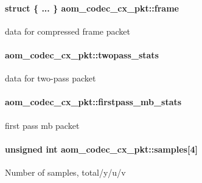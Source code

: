 \paragraph[{\texorpdfstring{frame}{frame}}]{\setlength{\rightskip}{0pt plus 5cm}struct \{ ... \}   aom\+\_\+codec\+\_\+cx\+\_\+pkt\+::frame}\hypertarget{structaom__codec__cx__pkt_a4180a6ae59b0d295bc915d4689df4cb0}{}\label{structaom__codec__cx__pkt_a4180a6ae59b0d295bc915d4689df4cb0}
data for compressed frame packet 
\paragraph[{\texorpdfstring{twopass\+\_\+stats}{twopass_stats}}]{ aom\+\_\+codec\+\_\+cx\+\_\+pkt\+::twopass\+\_\+stats}\hypertarget{structaom__codec__cx__pkt_a40d469839bcd8195c3c8e80db6561dbb}{}\label{structaom__codec__cx__pkt_a40d469839bcd8195c3c8e80db6561dbb}
data for two-\/pass packet 
\paragraph[{\texorpdfstring{firstpass\+\_\+mb\+\_\+stats}{firstpass_mb_stats}}]{ aom\+\_\+codec\+\_\+cx\+\_\+pkt\+::firstpass\+\_\+mb\+\_\+stats}\hypertarget{structaom__codec__cx__pkt_a8ce39bab39da5a247a27e42eb78386e2}{}\label{structaom__codec__cx__pkt_a8ce39bab39da5a247a27e42eb78386e2}
first pass mb packet 
\paragraph[{\texorpdfstring{samples}{samples}}]{\setlength{\rightskip}{0pt plus 5cm}unsigned int aom\+\_\+codec\+\_\+cx\+\_\+pkt\+::samples\mbox{[}4\mbox{]}}\hypertarget{structaom__codec__cx__pkt_ae506ecf56b35d126ac24eb2c3ba7bb07}{}\label{structaom__codec__cx__pkt_ae506ecf56b35d126ac24eb2c3ba7bb07}
Number of samples, total/y/u/v 
